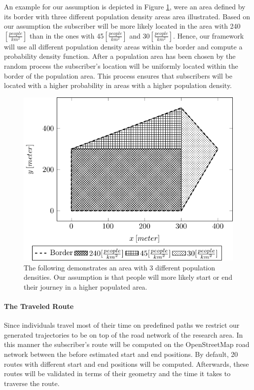 An example for our assumption is depicted in Figure \ref{fig:populationgrid}, were an area defined by its border with three different population density areas area illustrated. Based on our assumption the subscriber will be more likely located in the area with 240$[\frac{people}{km^2}]$ than in the ones with 45$[\frac{people}{km^2}]$ and 30$[\frac{people}{km^2}]$. Hence, our framework will use all different population density areas within the border and compute a probability density function. After a population area has been chosen by the random process the subscriber's location will be uniformly located within the border of the population area. This process ensures that subscribers will be located with a higher probability in areas with a higher population density.
	\begin{figure}[h!]
		\label{fig:populationgrid}
		\caption{ The following demonstrates an area with 3 different population densities. Our assumption is that people will more likely start or end their journey in a higher populated area.
		}
		\includegraphics[width=0.9\columnwidth]{populationgrid}
	\end{figure}
\paragraph{The Traveled Route}
Since individuals travel most of their time on predefined paths we restrict our generated trajectories to be on top of the road network of the research area. In this manner the subscriber's route will be computed on the OpenStreetMap road network between the before estimated start and end positions. By default, 20 routes with different start and end positions will be computed. Afterwards, these routes will be validated in terms of their geometry and the time it takes to traverse the route.

